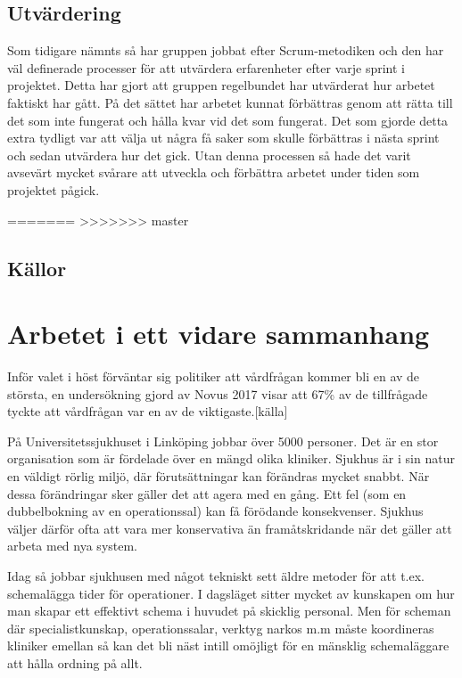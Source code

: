 \subsection{Utvärdering}
Som tidigare nämnts så har gruppen jobbat efter Scrum-metodiken och den har väl definerade processer för att utvärdera erfarenheter efter varje sprint i projektet. Detta har gjort att gruppen regelbundet har utvärderat hur arbetet faktiskt har gått. På det sättet har arbetet kunnat förbättras genom att rätta till det som inte fungerat och hålla kvar vid det som fungerat. Det som gjorde detta extra tydligt var att välja ut några få saker som skulle förbättras i nästa sprint och sedan utvärdera hur det gick. Utan denna processen så hade det varit avsevärt mycket svårare att utveckla och förbättra arbetet under tiden som projektet pågick.

=======
>>>>>>> master
\subsection{Källor}


\section{Arbetet i ett vidare sammanhang}

Inför valet i höst förväntar sig politiker att vårdfrågan kommer bli en av de största, en undersökning gjord av Novus 2017 visar att 67\% av de tillfrågade tyckte att vårdfrågan var en av de viktigaste.[källa]

På Universitetssjukhuset i Linköping jobbar över 5000 personer. Det är en stor organisation som är fördelade över en mängd olika kliniker. Sjukhus är i sin natur en väldigt rörlig miljö, där förutsättningar kan förändras mycket snabbt. När dessa förändringar sker gäller det att agera med en gång. Ett fel (som en dubbelbokning av en operationssal) kan få förödande konsekvenser. Sjukhus väljer därför ofta att vara mer konservativa än framåtskridande när det gäller att arbeta med nya system.

Idag så jobbar sjukhusen med något tekniskt sett äldre metoder för att t.ex. schemalägga tider för operationer. I dagsläget sitter mycket av kunskapen om hur man skapar ett effektivt schema i huvudet på skicklig personal. Men för scheman där specialistkunskap, operationssalar, verktyg narkos m.m måste koordineras kliniker emellan så kan det bli näst intill omöjligt för en mänsklig schemaläggare att hålla ordning på allt.

